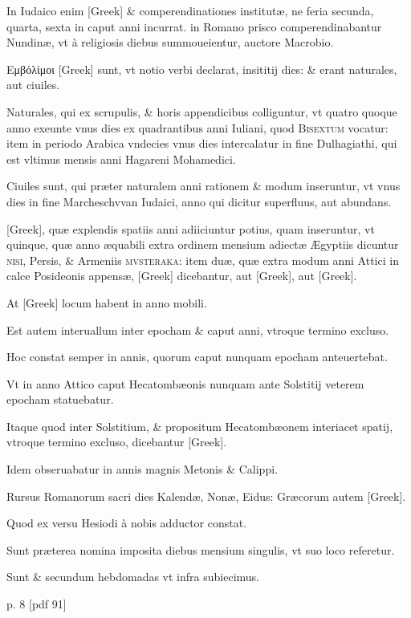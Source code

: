 In Iudaico enim \textgreek{[Greek]} \& comperendinationes institutæ, ne
feria secunda, quarta, sexta in caput anni incurrat. in Romano prisco
comperendinabantur Nundinæ, vt à religiosis diebus summoueientur,
auctore Macrobio.

\textgreek{Εμβόλίμοι [Greek]} sunt, vt notio verbi declarat, insititij
dies: \& erant naturales, aut ciuiles.

Naturales, qui ex scrupulis, \&
horis appendicibus colliguntur, vt quatro quoque anno exeunte vnus
dies ex quadrantibus anni Iuliani, quod \textsc{Bisextum} vocatur: item
in periodo Arabica vndecies vnus dies intercalatur in fine Dulhagiathi,
qui est vltimus mensis anni Hagareni Mohamedici.

Ciuiles sunt,
qui præter naturalem anni rationem \& modum inseruntur, vt vnus
dies in fine Marcheschvvan Iudaici, anno qui dicitur superfluus, aut
abundans.

\textgreek{[Greek]}, quæ explendis spatiis anni adiiciuntur potius,
quam inseruntur, vt quinque, quæ anno æquabili extra ordinem mensium
adiectæ Ægyptiis dicuntur \textsc{nisi}, Persis, \& Armeniis \textsc{mvsteraka}: 
item duæ, quæ extra modum anni Attici in calce Posideonis 
appensæ, \textgreek{[Greek]} dicebantur,
 aut \textgreek{[Greek]}, aut \textgreek{[Greek]}.

At \textgreek{[Greek]} locum habent in anno mobili.

Est autem interuallum
inter epocham \& caput anni, vtroque termino excluso.

Hoc
constat semper in annis, quorum caput nunquam epocham anteuertebat.

Vt in anno Attico caput Hecatombæonis nunquam ante Solstitij
veterem epocham statuebatur.

Itaque quod inter Solstitium, \&
propositum Hecatombæonem interiacet spatij, vtroque termino excluso,
dicebantur \textgreek{[Greek]}.

Idem obseruabatur in annis magnis
Metonis \& Calippi.

Rursus Romanorum sacri dies Kalendæ, Nonæ,
Eidus: Græcorum autem \textgreek{[Greek]}.

Quod ex versu Hesiodi à
nobis adductor constat.

Sunt præterea nomina imposita diebus mensium 
singulis, vt suo loco referetur.

Sunt \& secundum hebdomadas
vt infra subiecimus.



p. 8 [pdf 91]

